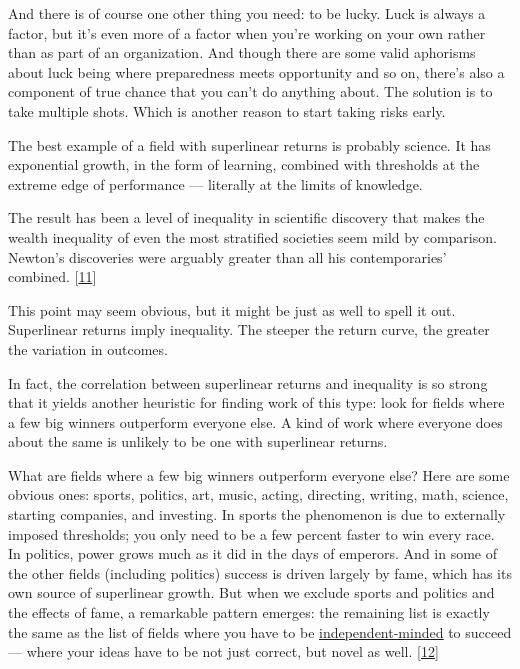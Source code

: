 And there is of course one other thing you need:
                  to be lucky. Luck is always a factor, but it's even more of a
                  factor when you're working on your own rather than as part of
                  an organization. And though there are some valid aphorisms
                  about luck being where preparedness meets opportunity and so
                  on, there's also a component of true chance that you can't do
                  anything about. The solution is to take multiple shots. Which
                  is another reason to start taking risks early.






                  The best example of a field with superlinear returns is
                  probably science. It has exponential growth, in the form of
                  learning, combined with thresholds at the extreme edge of
                  performance --- literally at the limits of knowledge.

The
                  result has been a level of inequality in scientific discovery
                  that makes the wealth inequality of even the most stratified
                  societies seem mild by comparison. Newton's discoveries were
                  arguably greater than all his contemporaries' combined.
                  [\href{\#f11n}{11}]

This point may seem obvious, but it might be just
                  as well to spell it out. Superlinear returns imply inequality.
                  The steeper the return curve, the greater the variation in
                  outcomes.

In fact, the correlation between
                  superlinear returns and inequality is so strong that it yields
                  another heuristic for finding work of this type: look for
                  fields where a few big winners outperform everyone else. A
                  kind of work where everyone does about the same is unlikely to
                  be one with superlinear returns.

What are fields
                  where a few big winners outperform everyone else? Here are
                  some obvious ones: sports, politics, art, music, acting,
                  directing, writing, math, science, starting companies, and
                  investing. In sports the phenomenon is due to externally
                  imposed thresholds; you only need to be a few percent faster
                  to win every race. In politics, power grows much as it did in
                  the days of emperors. And in some of the other fields
                  (including politics) success is driven largely by fame, which
                  has its own source of superlinear growth. But when we exclude
                  sports and politics and the effects of fame, a remarkable
                  pattern emerges: the remaining list is exactly the same as the
                  list of fields where you have to be
                  \href{http://www.paulgraham.com/think.html}{\underline{independent-minded}} to succeed
                  --- where your ideas have to be not just correct, but
                  novel as well.
                  [\href{\#f12n}{12}]

